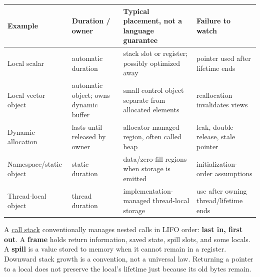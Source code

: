 {\def\LTcaptype{none} %
\begin{longtable}[]{@{}
  >{\raggedright\arraybackslash}p{}
  >{\raggedright\arraybackslash}p{}
  >{\raggedright\arraybackslash}p{}
  >{\raggedright\arraybackslash}p{}@{}}
\toprule\noalign{}
\begin{minipage}[b]{\linewidth}\raggedright
Example
\end{minipage} & \begin{minipage}[b]{\linewidth}\raggedright
Duration / owner
\end{minipage} & \begin{minipage}[b]{\linewidth}\raggedright
Typical placement, not a language guarantee
\end{minipage} & \begin{minipage}[b]{\linewidth}\raggedright
Failure to watch
\end{minipage} \\
\midrule\noalign{}
\endhead
\bottomrule\noalign{}
\endlastfoot
Local scalar & automatic duration & stack slot or register; possibly optimized away & pointer used after lifetime ends \\
Local vector object & automatic object; owns dynamic buffer & small control object separate from allocated elements & reallocation invalidates views \\
Dynamic allocation & lasts until released by owner & allocator-managed region, often called heap & leak, double release, stale pointer \\
Namespace/static object & static duration & data/zero-fill regions when storage is emitted & initialization-order assumptions \\
Thread-local object & thread duration & implementation-managed thread-local storage & use after owning thread/lifetime ends \\
\end{longtable}
}

A \hyperref[appendix-b081b7abe193]{call stack} conventionally manages nested calls in LIFO order: \textbf{last in, first out}. A \textbf{frame} holds return information, saved state, spill slots, and some locals. A \textbf{spill} is a value stored to memory when it cannot remain in a register. Downward stack growth is a convention, not a universal law. Returning a pointer to a local does not preserve the local's lifetime just because its old bytes remain.

